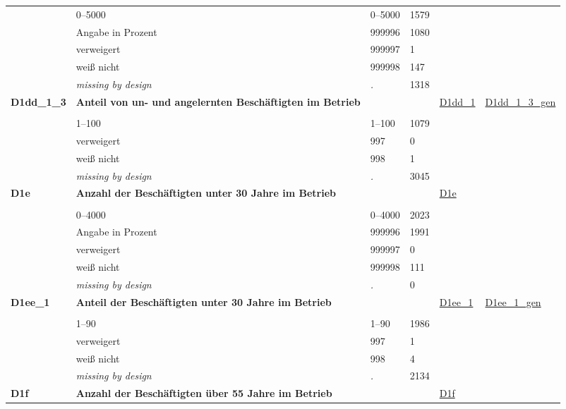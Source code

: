 \begin{longtable}{| L{2.45cm} | L{6cm} | C{1.5cm} | R{1cm} | C{2.25cm} | C{2.25cm} |}
   & 0--5000 & 0--5000 & 1579 &  &  \\ 
   & Angabe in Prozent & 999996 & 1080 &  &  \\ 
   & verweigert & 999997 & 1 &  &  \\ 
   & weiß nicht & 999998 & 147 &  &  \\ 
   & \textit{missing by design} & \textit{.} & 1318 &  &  \\ 
   \midrule
\textbf{D1dd\_1\_3}\label{var:D1dd:1:3} & \textbf{Anteil von un- und angelernten Beschäftigten im Betrieb} &  &  & \hyperref[D1dd:1]{D1dd\_1} & \hyperref[var:suf:D1dd:1:3:gen]{D1dd\_1\_3\_gen} \\ 
   &  &  &  &  &  \\ 
   & 1--100 & 1--100 & 1079 &  &  \\ 
   & verweigert & 997 & 0 &  &  \\ 
   & weiß nicht & 998 & 1 &  &  \\ 
   & \textit{missing by design} & \textit{.} & 3045 &  &  \\ 
   \midrule
\textbf{D1e}\label{var:D1e} & \textbf{Anzahl der Beschäftigten unter 30 Jahre im Betrieb} &  &  & \hyperref[D1e]{D1e} & \hyperref[var:suf:]{} \\ 
   &  &  &  &  &  \\ 
   & 0--4000 & 0--4000 & 2023 &  &  \\ 
   & Angabe in Prozent & 999996 & 1991 &  &  \\ 
   & verweigert & 999997 & 0 &  &  \\ 
   & weiß nicht & 999998 & 111 &  &  \\ 
   & \textit{missing by design} & \textit{.} & 0 &  &  \\ 
   \midrule
\textbf{D1ee\_1}\label{var:D1ee:1} & \textbf{Anteil der Beschäftigten unter 30 Jahre im Betrieb} &  &  & \hyperref[D1ee:1]{D1ee\_1} & \hyperref[var:suf:D1ee:1:gen]{D1ee\_1\_gen} \\ 
   &  &  &  &  &  \\ 
   & 1--90 & 1--90 & 1986 &  &  \\ 
   & verweigert & 997 & 1 &  &  \\ 
   & weiß nicht & 998 & 4 &  &  \\ 
   & \textit{missing by design} & \textit{.} & 2134 &  &  \\ 
   \midrule
\textbf{D1f}\label{var:D1f} & \textbf{Anzahl der Beschäftigten über 55 Jahre im Betrieb} &  &  & \hyperref[D1f]{D1f} & \hyperref[var:suf:]{} \\ 

\end{longtable}

